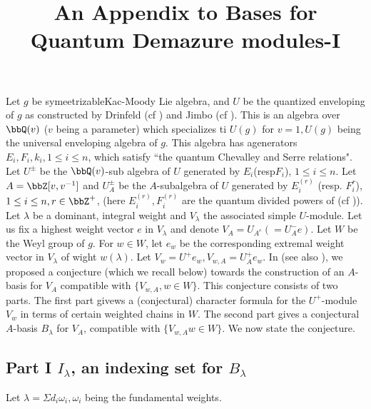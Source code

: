 \title{An Appendix to Bases for Quantum Demazure modules-I}

\author{}

\date{}
\maketitle

\phantom{a}

Let $g$ be symeetrizable\pageoriginale Kac-Moody Lie algebra, and $U$ be the quantized enveloping of $g$ as constructed by Drinfeld (cf \cite{art10-keyD}) and Jimbo (cf \cite{art10-keyJ}). This is an algebra over $\bbQ(v)$ ($v$ being a parameter) which specializes ti $U(g)$ for $v=1, U(g)$ being the universal enveloping algebra of $g$. This algebra has agenerators $E_{i}, F_{i}, k_{i}, 1 \leq i \leq n$, which satisfy ``the quantum Chevalley and Serre relations". Let $U^{\pm}$ be the $\bbQ(v)$-sub algebra of $U$ generated by $E_{i}$(resp$F_{i}$), $1 \leq i \leq n$. Let $A = \bbZ[v, v^{-1}]$ and $U_{A}^{\pm}$ be the $A$-subalgebra of $U$ generated by $E_{i}^{(r)}$ (resp. $F_{i}^{r}$), $1 \leq i \leq n, r \in \bbZ^{+}$, (here $E_{i}^{(r)}, F_{i}^{(r)}$ are the quantum divided powers of (cf \cite{art10-keyJ})). Let $\lambda$ be a dominant, integral weight and $V_{\lambda}$ the associated simple $U$-module. Let us fix a highest weight vector $e$ in $V_{\lambda}$ and denote $V_{A}=U_{A^{e}}(=U_{A}^{-}e)$. Let $W$ be the Weyl group of $g$. For $w \in W$, let $e_{w}$ be the corresponding extremal weight vector in $V_{\lambda}$ of wight $w(\lambda)$. Let $V_{w} = U^{+}e_{w}, V_{w, A} = U_{A}^{+}e_{w}$. In \cite{art10-keyLa} (see also \cite{art10-keyLS}), we proposed a conjecture (which we recall below) towards the construction of an $A$-basis for $V_{A}$ compatible with $\{V_{w, A}, w \in W\}$. This conjecture consists of two parts. The first part givews a (conjectural) character formula for the  $U^{+}$-module $V_{w}$ in terms of certain weighted chains in $W$. The second part gives a conjectural $A$-basis $B_{\lambda}$ for $V_{A}$, compatible with
 $\{V_{w, A} w \in W \}$. We now state the conjecture.  

\subsection*{Part I $I_{\lambda}$, an indexing set for $B_{\lambda}$}
Let $\lambda = \Sigma d_{i}\omega_{i}, \omega_{i}$ being the fundamental weights.

